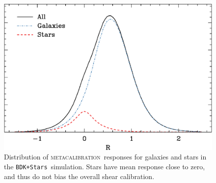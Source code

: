 \documentclass[iop]{emulateapj}
\newcommand{\snr}{$S/N$}
\newcommand{\mcal}{\textsc{metacalibration}}
\newcommand{\bdsim}{\texttt{BDK}}
\newcommand{\bdstar}{\texttt{BDK+Stars}}
\begin{document}

\begin{figure}
    \centering
    \includegraphics[width=\columnwidth]{R-bdj03-bdj03stars.eps}

    \caption{Distribution of \mcal\ responses for galaxies and stars in
    the \bdstar\ simulation.  Stars have mean response close to zero,
    and thus do not bias the overall shear calibration.}

\label{fig:Rstars}
\end{figure}





\end{document}
